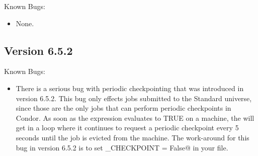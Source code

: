 \noindent Known Bugs:

\begin{itemize}

\item None.

\end{itemize}


\subsection{\label{sec:New-6-5-3}Version 6.5.2}

\noindent Known Bugs:
\begin{itemize}

\item There is a serious bug with periodic checkpointing that was
  introduced in version 6.5.2.
  This bug only effects jobs submitted to the Standard universe, since
  those are the only jobs that can perform periodic checkpoints in
  Condor. 
  As soon as the  expression evaluates to
  TRUE on a machine, the  will get in a loop where it
  continues to request a periodic checkpoint every 5 seconds until the
  job is evicted from the machine.
  The work-around for this bug in version 6.5.2 is to set
  \verb@PERIODIC_CHECKPOINT = False@ in your 
  file.

\end{itemize}

